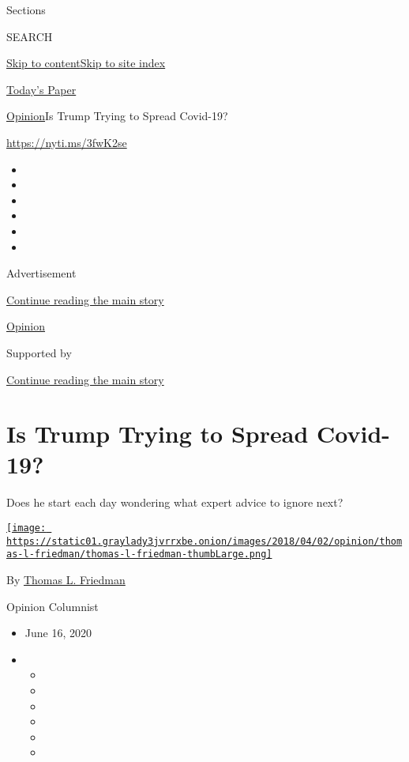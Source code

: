 Sections

SEARCH

\protect\hyperlink{site-content}{Skip to
content}\protect\hyperlink{site-index}{Skip to site index}

\href{https://myaccount.nytimes3xbfgragh.onion/auth/login?response_type=cookie\&client_id=vi}{}

\href{https://www.nytimes3xbfgragh.onion/section/todayspaper}{Today's
Paper}

\href{/section/opinion}{Opinion}\textbar{}Is Trump Trying to Spread
Covid-19?

\url{https://nyti.ms/3fwK2se}

\begin{itemize}
\item
\item
\item
\item
\item
\item
\end{itemize}

Advertisement

\protect\hyperlink{after-top}{Continue reading the main story}

\href{/section/opinion}{Opinion}

Supported by

\protect\hyperlink{after-sponsor}{Continue reading the main story}

\hypertarget{is-trump-trying-to-spread-covid-19}{%
\section{Is Trump Trying to Spread
Covid-19?}\label{is-trump-trying-to-spread-covid-19}}

Does he start each day wondering what expert advice to ignore next?

\href{https://www.nytimes3xbfgragh.onion/by/thomas-l-friedman}{\texttt{[image: https://static01.graylady3jvrrxbe.onion/images/2018/04/02/opinion/thomas-l-friedman/thomas-l-friedman-thumbLarge.png]}}

By \href{https://www.nytimes3xbfgragh.onion/by/thomas-l-friedman}{Thomas
L. Friedman}

Opinion Columnist

\begin{itemize}
\item
  June 16, 2020
\item
  \begin{itemize}
  \item
  \item
  \item
  \item
  \item
  \item
  \end{itemize}
\end{itemize}


